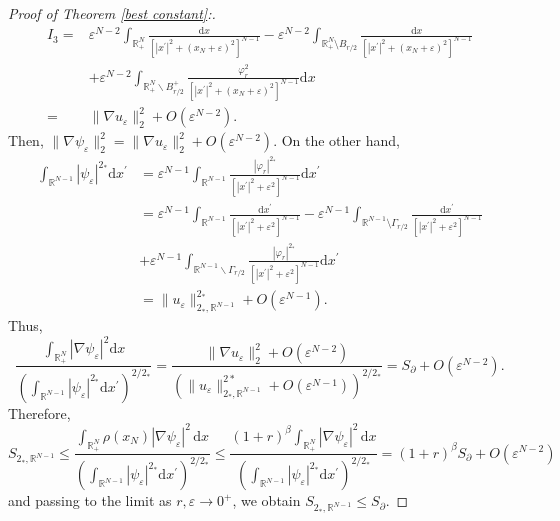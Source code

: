 \documentclass[12pt,reqno]{amsart}
\begin{document}
\begin{proof}[Proof of Theorem \ref{best constant}:]
\begin{align*}
    I_3=&\varepsilon^{N-2}\int_{\mathds{R}^N_+}\frac{\mathrm{d}x}{[|x^\prime|^2+(x_N+\varepsilon)^2]^{N-1}}-\varepsilon^{N-2}\int_{\mathds{R}^N_+\setminus B_{r/2}}\frac{\mathrm{d}x}{[|x^\prime|^2+(x_N+\varepsilon)^2]^{N-1}}\\
    &+\varepsilon^{N-2}\int_{\mathds{R}^{N}_+\backslash B^+_{r/2}}\frac{\varphi_r^2}{[|x^\prime|^2+(x_N+\varepsilon)^2]^{N-1}}\mathrm{d}x\\
    =& \|\nabla u_\varepsilon\|_2^2+O(\varepsilon^{N-2}).
\end{align*}
Then, $\|\nabla \psi_\varepsilon\|_2^2= \|\nabla u_\varepsilon\|_2^2+O(\varepsilon^{N-2})$. On the other hand, 
\begin{align*}
    \int_{\mathds{R}^{N-1}}|\psi_\varepsilon|^{2_\ast}\mathrm{d}x^\prime&=\varepsilon^{N-1}\int_{\mathds{R}^{N-1}}\frac{|\varphi_r|^{2_\ast}}{[|x^\prime|^2+\varepsilon^2]^{N-1}}\mathrm{d}x^\prime\\
    &= \varepsilon^{N-1}\int_{\mathds{R}^{N-1}}\frac{\mathrm{d}x^\prime}{[|x^\prime|^2+\varepsilon^2]^{N-1}}-\varepsilon^{N-1}\int_{\mathds{R}^{N-1}\setminus \Gamma_{r/2}}\frac{\mathrm{d}x^\prime}{[|x^\prime|^2+\varepsilon^2]^{N-1}} \\
    &+\varepsilon^{N-1}\int_{\mathds{R}^{N-1}\backslash \Gamma_{r/2}}\frac{|\varphi_r|^{2_\ast}}{[|x^\prime|^2+\varepsilon^2]^{N-1}}\mathrm{d}x^\prime\\
    &= \|u_\varepsilon\|_{2_\ast, \mathds{R}^{N-1}}^{2_\ast}+O(\varepsilon^{N-1}).
\end{align*}
Thus,
\begin{equation*}
    \frac{\int_{\mathds{R}^N_+}|\nabla \psi_\varepsilon|^2\mathrm{d}x}{\left(\int_{\mathds{R}^{N-1}}|\psi_\varepsilon|^{2_\ast}\mathrm{d}x^\prime\right)^{2/2_\ast}}= \frac{\|\nabla u_\varepsilon\|_2^2+O(\varepsilon^{N-2})}{\left(\|u_\varepsilon\|_{2_\ast,\mathds{R}^{N-1}}^{2\ast}+O(\varepsilon^{N-1})\right)^{2/2_\ast}}=S_\partial+O(\varepsilon^{N-2}).
\end{equation*}
Therefore,
\begin{equation*}
    S_{2_\ast,\mathds{R}^{N-1}}\leq \frac{\int_{\mathds{R}^{N}_+}\rho(x_N)|\nabla \psi_\varepsilon|^2\, \mathrm{d} x}{\left(\int_{\mathds{R}^{N-1}}|\psi_\varepsilon|^{2_\ast}\mathrm{d}x^\prime\right)^{2/2_\ast}}\leq \frac{(1+r)^\beta\int_{\mathds{R}^{N}_+}|\nabla \psi_\varepsilon|^2\, \mathrm{d} x}{\left(\int_{\mathds{R}^{N-1}}|\psi_\varepsilon|^{2_\ast}\mathrm{d}x^\prime\right)^{2/2_\ast}}= (1+r)^\beta S_{\partial}+O(\varepsilon^{N-2})
\end{equation*}
and passing to the limit as $r, \varepsilon \longrightarrow 0^+$, we obtain $S_{2_\ast,\mathds{R}^{N-1}}\leq S_{\partial}$. 


\end{proof}
\end{document}
